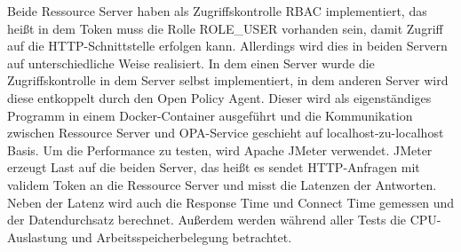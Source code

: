 Beide Ressource Server haben als Zugriffskontrolle \ac{RBAC} 
implementiert, das heißt in dem Token muss die Rolle ROLE\_USER vorhanden sein, damit 
Zugriff auf die HTTP-Schnittstelle erfolgen kann. Allerdings wird dies in beiden Servern auf 
unterschiedliche Weise realisiert. In dem einen Server wurde die Zugriffskontrolle in dem Server 
selbst implementiert, in dem anderen Server wird diese entkoppelt durch den Open Policy Agent. 
Dieser wird als eigenständiges Programm in einem Docker-Container ausgeführt und die 
Kommunikation zwischen Ressource Server und OPA-Service geschieht auf localhost-zu-localhost Basis. 
Um die Performance zu testen, wird Apache JMeter verwendet. JMeter erzeugt Last auf die 
beiden Server, das heißt es sendet HTTP-Anfragen mit validem Token an die Ressource 
Server und misst die Latenzen der Antworten. Neben der Latenz wird auch die Response 
Time und Connect Time gemessen und der Datendurchsatz berechnet. Außerdem werden während aller Tests die CPU-Auslastung und Arbeitsspeicherbelegung betrachtet. 